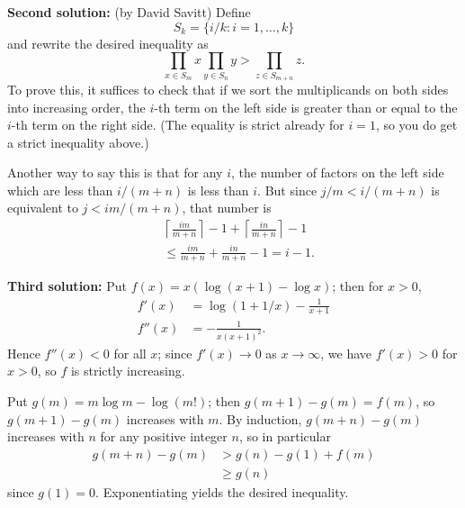 \documentclass[amssymb,twocolumn,pra,10pt,aps]{revtex4-1}
\begin{document}
\begin{itemize}
\textbf{Second solution:} (by David Savitt)
Define
\[
S_k = \{i/k: i=1, \dots, k\}
\]
and rewrite the desired inequality as
\[
\prod_{x \in S_m} x \prod_{y \in S_n} y > \prod_{z \in S_{m+n}} z.
\]
To prove this, it suffices to check that if we sort the multiplicands
on both sides into increasing order, the $i$-th term on the left
side is greater than or equal to the $i$-th term on the right side.
(The equality is strict already for $i=1$, so you do get a strict inequality
above.)

Another way to say this is that for
any $i$, the number of factors on the left side which are less than
$i/(m+n)$ is less than $i$. But since $j/m < i/(m+n)$ is equivalent to
$j < im/(m+n)$, that number is
\begin{align*}
&\left\lceil \frac{im}{m+n} \right\rceil -1 +
\left\lceil \frac{in}{m+n} \right\rceil -1 \\
&\leq \frac{im}{m+n} + \frac{in}{m+n} - 1 = i-1.
\end{align*}

\textbf{Third solution:}
Put $f(x) = x (\log (x+1) - \log x)$; then for $x>0$,
\begin{align*}
f'(x) &= \log(1 + 1/x) - \frac{1}{x+1} \\
f''(x) &= - \frac{1}{x(x+1)^2}.
\end{align*}
Hence $f''(x) < 0$ for all $x$; since $f'(x) \to 0$ as $x \to \infty$,
we have $f'(x) > 0$ for $x>0$, so $f$ is strictly increasing.

Put $g(m) = m \log m - \log(m!)$; then $g(m+1) - g(m) = f(m)$,
so $g(m+1)-g(m)$ increases with $m$. By induction,
$g(m+n) - g(m)$ increases with $n$ for any positive integer $n$,
so in particular
\begin{align*}
g(m+n) - g(m) &> g(n) - g(1) + f(m) \\
&\geq g(n)
\end{align*}
since $g(1) = 0$. Exponentiating yields the desired inequality.


\end{itemize}
\end{document}
